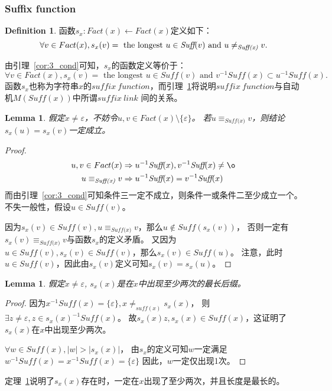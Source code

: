 \documentclass[UTF8]{ctexart}
\newtheorem{lem}[thm]{Lemma}
\theoremstyle{definition}
\newtheorem{defn}[thm]{Definition}
\theoremstyle{remark}
\numberwithin{equation}{subsection}
\newcommand{\equsuf}[1][x]{\equiv_{\textit{Suff(#1)}}}
\newcommand{\Suff}{\textit{Suff}}
\begin{document}
\subsubsection{Suffix function}
	
	\begin{defn}
	\label{defn:sx}
	函数$s_x: Fact(x) \leftarrow Fact(x)$定义如下：
	\[
		\forall v \in Fact(x), s_x(v) = \text{ the longest } u \in \Suff(v) \text{ and } u \neq_{\textit{\Suff(x)}} v.
	\]
	\end{defn}
	由引理~\ref{cor:3_cond}可知，$s_x$的函数定义等价于：
	\[
		\forall v \in Fact(x), s_x(v) = \text{ the longest } u \in \Suff(v) \text{ and } v^{-1} \Suff(x) \subset u^{-1} \Suff(x).
	\]
	函数$s_x$也称为字符串$x$的$suffix\ function$，而引理~\ref{lem:sx_eq}将说明$suffix\ function$与自动机$M(\Suff(x))$中所谓$suffix\ link$ 间的关系。
	
	\begin{lem}
	\label{lem:sx_eq}
		假定$x \neq \varepsilon$，不妨令$u,v \in Fact(x) \setminus \{ \varepsilon \}$。
		若$u \equsuf v$，则结论$s_x(u) = s_x(v)$一定成立。
	\end{lem}
	\begin{proof}
		\begin{align*}
			u,v \in Fact(x)	&\Rightarrow u^{-1} \Suff(x), v^{-1} \Suff(x) \neq {\o}	\\
			u \equsuf v		&\Rightarrow u^{-1} \Suff(x) = v^{-1} \Suff(x)
		\end{align*}
		而由引理~\ref{cor:3_cond}可知条件三一定不成立，则条件一或条件二至少成立一个。
		不失一般性，假设$u \in \Suff(v)$。
		
		因为$s_x(v) \in \Suff(v), u \equsuf v$，那么$u \notin \Suff(s_x(v))$，
		否则一定有$s_x(v) \equsuf v$与函数$s_x$的定义矛盾。
		又因为$u \in \Suff(v), s_x(v) \in \Suff(v)$，那么$s_x(v) \in \Suff(u)$。
		注意，此时$u \in \Suff(v)$，因此由$s_x(v)$定义可知$s_x(v) = s_x(u)$。
	\end{proof}
	
	\begin{lem}
	\label{lem:sx_twice}
		假定$x \neq \varepsilon$, $s_x(x)$是在$x$中出现至少两次的最长后缀。
	\end{lem}
	\begin{proof}
		因为$x^{-1} \Suff(x) = \{ \varepsilon \}, x \neq_{suff(x)} s_x(x)$，
		则$\exists z \neq \varepsilon, z \in s_x(x)^{-1} \Suff(x)$。
		故$s_x(x)z, s_x(x) \in \Suff(x)$，这证明了$s_x(x)$在$x$中出现至少两次。
		
		$\forall w \in \Suff(x), |w| > |s_x(x)|$，
		由$s_x$的定义可知$w$一定满足$w^{-1} \Suff(x) = x^{-1} \Suff(x) = \{ \varepsilon \}$
		因此，$w$一定仅出现1次。
	\end{proof}
	定理~\ref{lem:sx_twice}说明了$s_x(x)$存在时，一定在$x$出现了至少两次，并且长度是最长的。
	
\end{document}
